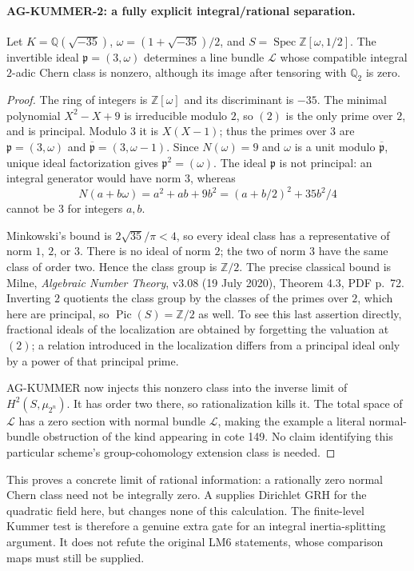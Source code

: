 \documentclass[11pt,a4paper]{article}
\begin{document}
\paragraph{AG-KUMMER-2: a fully explicit integral/rational separation.}
Let $K=\mathbb Q(\sqrt{-35})$, $\omega=(1+\sqrt{-35})/2$, and
$S=\operatorname{Spec}\mathbb Z[\omega,1/2]$. The invertible ideal
$\mathfrak p=(3,\omega)$ determines a line bundle $\mathcal L$ whose
compatible integral $2$-adic Chern class is nonzero, although its image
after tensoring with $\mathbb Q_2$ is zero.

\begin{proof}
The ring of integers is $\mathbb Z[\omega]$ and its discriminant is
$-35$. The minimal polynomial $X^2-X+9$ is irreducible modulo $2$,
so $(2)$ is the only prime over $2$, and is principal. Modulo $3$ it is
$X(X-1)$; thus the primes over $3$ are
$\mathfrak p=(3,\omega)$ and $\overline{\mathfrak p}=(3,\omega-1)$.
Since $N(\omega)=9$ and $\omega$ is a unit modulo
$\overline{\mathfrak p}$, unique ideal factorization gives
$\mathfrak p^2=(\omega)$. The ideal $\mathfrak p$ is not principal:
an integral generator would have norm $3$, whereas
\[
 N(a+b\omega)=a^2+ab+9b^2=(a+b/2)^2+35b^2/4
\]
cannot be $3$ for integers $a,b$.

Minkowski's bound is $2\sqrt{35}/\pi<4$, so every ideal class has a
representative of norm $1$, $2$, or $3$. There is no ideal of norm $2$;
the two of norm $3$ have the same class of order two. Hence the class
group is $\mathbb Z/2$. The precise classical bound is Milne,
\emph{Algebraic Number Theory}, v3.08 (19 July 2020), Theorem 4.3,
PDF p.~72. Inverting $2$ quotients the class group by the classes of
the primes over $2$, which here are principal, so
$\operatorname{Pic}(S)=\mathbb Z/2$ as well. To see this last assertion
directly, fractional ideals of the localization are obtained by forgetting
the valuation at $(2)$; a relation introduced in the localization differs
from a principal ideal only by a power of that principal prime.

AG-KUMMER now injects this nonzero class into the inverse limit of
$H^2(S,\mu_{2^n})$. It has order two there, so rationalization kills it.
The total space of $\mathcal L$ has a zero section with normal bundle
$\mathcal L$, making the example a literal normal-bundle obstruction of
the kind appearing in cote 149. No claim identifying this particular
scheme's group-cohomology extension class is needed.
\end{proof}

This proves a concrete limit of rational information: a rationally zero
normal Chern class need not be integrally zero. A supplies Dirichlet GRH
for the quadratic field here, but changes none of this calculation.
The finite-level Kummer test is therefore a genuine extra gate for an
integral inertia-splitting argument. It does not refute the original
LM6 statements, whose comparison maps must still be supplied.
\end{document}
